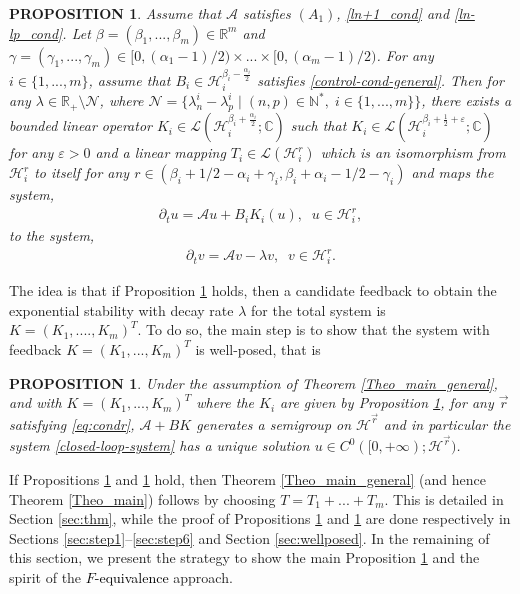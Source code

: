 \documentclass[11pt, dvipsnames]{amsart}
\newtheorem{prop}[theorem]{PROPOSITION}
\begin{document}
\begin{prop}
\label{prop:main}
Assume that $\mathcal{A}$ satisfies $(A_{1})$, \eqref{ln+1_cond} and \eqref{ln-lp_cond}. Let $\beta=(\beta_{1},...,\beta_{m})\in \mathbb{R}^{m}$ and $\gamma = (\gamma_{1},...,\gamma_{m})\in [0,(\alpha_{1}-1)/2)\times ...\times [0,(\alpha_{m}-1)/2)$. For any $i\in \{1,...,m\}$, assume that $B_{i}\in \mathcal{H}_{i}^{\beta_i- \frac{\alpha_i}{2}}$ satisfies \eqref{control-cond-general}.
Then for any $\lambda\in\mathbb{R}_{+}\setminus\mathcal{N}$, where $\mathcal{N} =\{\lambda_{n}^{i}-\lambda_{p}^{i} \;|\; (n,p)\in\mathbb{N}^{*},\;i\in\{1,...,m\}\}$,
there exists a bounded linear operator $K_{i}\in \mathcal{L}(\mathcal{H}^{\beta_i+\frac{\alpha_i}{2}}_{i};\mathbb{C})$ such that $K_{i}\in \mathcal{L}(\mathcal{H}^{\beta_i+\frac{1}{2}+\varepsilon}_{i};\mathbb{C})$ for any $\varepsilon>0$ and a linear mapping $T_{i}\in\mathcal{L}(\mathcal{H}_i^{r})$ which is an isomorphism  from $\mathcal{H}_i^{r}$ to itself for any $r\in(\beta_i+ 1/2-\alpha_i+\gamma_{i},\beta_i+ \alpha_i-1/2-\gamma_{i})$ and maps the system, 
\begin{equation}\label{sysdepart1}
\begin{array}{ll}
\partial_t u =\mathcal{A}u +B_{i}K_{i}(u),\;\;u\in \mathcal{H}^{r}_{i},
\end{array}
\end{equation}
to the system, 
\begin{equation}\label{sysarrive1}
    \begin{array}{ll}
\partial_t v =\mathcal{A}v -\lambda v,\;\;v\in \mathcal{H}^{r}_{i}.
\end{array} 
\end{equation}
\end{prop}

The idea is that if Proposition \ref{prop:main} holds, then a candidate feedback to obtain the exponential stability with decay rate $\lambda$ for the total system is $K = (K_{1},....,K_{m})^{T}$. To do so, the main step is to show that the system with feedback $K=(K_{1},...,K_{m})^{T}$ is well-posed, that is
\begin{prop}
\label{th:wellposed}
Under the assumption of Theorem \ref{Theo_main_general},
and with $K=(K_{1},...,K_{m})^{T}$ where the $K_{i}$ are given by Proposition \ref{prop:main}, for any $\vec{r}$ satisfying \eqref{eq:condr}, $\mathcal{A}+BK$ generates a semigroup on $\mathcal{H}^{\vec{r}}$ and in particular the system \eqref{closed-loop-system} has a unique solution $u\in C^{0}([0,+\infty);\mathcal{H}^{\vec{r}})$.
\end{prop}
If Propositions \ref{prop:main} and \ref{th:wellposed} hold, then Theorem \ref{Theo_main_general} (and hence Theorem \ref{Theo_main}) follows by choosing $T= T_{1}+...+T_{m}$. This is detailed in Section \ref{sec:thm}, while the proof of Propositions \ref{prop:main} and \ref{th:wellposed} are done respectively in Sections \ref{sec:step1}--\ref{sec:step6} and Section \ref{sec:wellposed}. In the remaining of this section, we present the strategy to show the main Proposition \ref{prop:main} and the spirit of the \textcolor{black}{$F$-equivalence} approach.
\\
\end{document}
